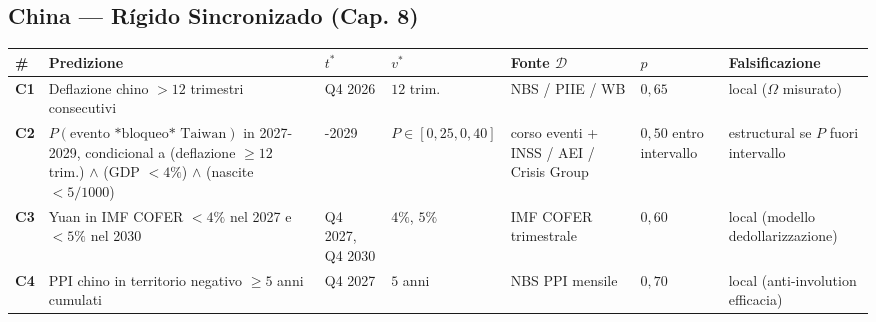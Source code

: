 \subsection{China --- Rígido Sincronizado (Cap.
8)}\label{cina-rigido-sincronizzato-cap.-8}

{\def\LTcaptype{none} %
{\small\begin{longtable}[]{@{}
  >{\raggedright\arraybackslash}p{}
  >{\raggedright\arraybackslash}p{}
  >{\raggedright\arraybackslash}p{}
  >{\raggedright\arraybackslash}p{}
  >{\raggedright\arraybackslash}p{}
  >{\raggedright\arraybackslash}p{}
  >{\raggedright\arraybackslash}p{}@{}}
\toprule\noalign{}
\begin{minipage}[b]{\linewidth}\raggedright
\#
\end{minipage} & \begin{minipage}[b]{\linewidth}\raggedright
Predizione
\end{minipage} & \begin{minipage}[b]{\linewidth}\raggedright
\(t^*\)
\end{minipage} & \begin{minipage}[b]{\linewidth}\raggedright
\(v^*\)
\end{minipage} & \begin{minipage}[b]{\linewidth}\raggedright
Fonte \(\mathcal{D}\)
\end{minipage} & \begin{minipage}[b]{\linewidth}\raggedright
\(p\)
\end{minipage} & \begin{minipage}[b]{\linewidth}\raggedright
Falsificazione
\end{minipage} \\
\midrule\noalign{}
\endhead
\bottomrule\noalign{}
\endlastfoot
\textbf{C1} & Deflazione chino \(> 12\) trimestri consecutivi & Q4 2026
& \(12\) trim. & NBS / PIIE / WB & \(0{,}65\) & local (\(\Omega\)
misurato) \\
\textbf{C2} & \(P(\text{evento *bloqueo* Taiwan})\) in 2027-2029,
condicional a (deflazione \(\geq 12\) trim.) \(\wedge\) (GDP \(< 4\%\))
\(\wedge\) (nascite \(< 5/1000\)) & 2027-2029 &
\(P \in [0{,}25, 0{,}40]\) & corso eventi + INSS / AEI / Crisis Group &
\(0{,}50\) entro intervallo & estructural se \(P\) fuori intervallo \\
\textbf{C3} & Yuan in IMF COFER \(< 4\%\) nel 2027 e \(< 5\%\) nel 2030
& Q4 2027, Q4 2030 & \(4\%\), \(5\%\) & IMF COFER trimestrale &
\(0{,}60\) & local (modello dedollarizzazione) \\
\textbf{C4} & PPI chino in territorio negativo \(\geq 5\) anni cumulati
& Q4 2027 & \(5\) anni & NBS PPI mensile & \(0{,}70\) & local
(anti-involution efficacia) \\
\end{longtable}}
}

